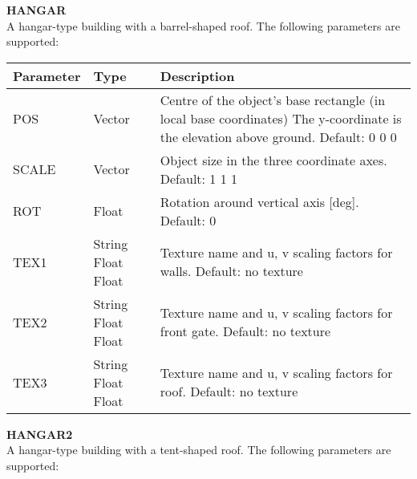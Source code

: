\documentclass[Orbiter Developer Manual.tex]{subfiles}
\begin{document}
\noindent
\textbf{HANGAR}\\
A hangar-type building with a barrel-shaped roof. The following parameters are supported:

	\begin{longtable}{ |p{}|p{}|p{}| }
	\hline\rule{0pt}{2ex}
	\textbf{Parameter} & \textbf{Type} & \textbf{Description}\\
	\hline\rule{0pt}{2ex}
	POS & Vector & Centre of the object's base rectangle (in local base coordinates) The y-coordinate is the elevation above ground. Default: 0 0 0\\
	\hline\rule{0pt}{2ex}
	SCALE & Vector & Object size in the three coordinate axes. Default: 1 1 1\\
	\hline\rule{0pt}{2ex}
	ROT & Float & Rotation around vertical axis [deg]. Default: 0\\
	\hline\rule{0pt}{2ex}
	TEX1 & String Float Float & Texture name and u, v scaling factors for walls. Default: no texture\\
	\hline\rule{0pt}{2ex}
	TEX2 & String Float Float & Texture name and u, v scaling factors for front gate. Default: no texture\\
	\hline\rule{0pt}{2ex}
	TEX3 & String Float Float & Texture name and u, v scaling factors for roof. Default: no texture\\
	\hline
	\end{longtable}

\noindent
\textbf{HANGAR2}\\
A hangar-type building with a tent-shaped roof. The following parameters are supported:
\end{document}
